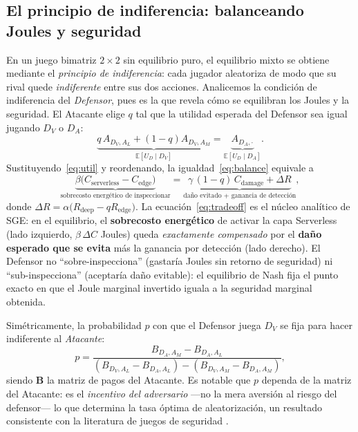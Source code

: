 \documentclass[10pt,twocolumn]{article}
\begin{document}
\subsection{El principio de indiferencia: balanceando Joules y seguridad}
\label{sec:indiff}
En un juego bimatriz $2\times2$ sin equilibrio puro, el equilibrio mixto se obtiene
mediante el \emph{principio de indiferencia}: cada jugador aleatoriza de modo que su
rival quede \emph{indiferente} entre sus dos acciones. Analicemos la condici\'on de
indiferencia del \emph{Defensor}, pues es la que revela c\'omo se equilibran los
Joules y la seguridad. El Atacante elige $q$ tal que la utilidad esperada del
Defensor sea igual jugando $D_V$ o $D_A$:
\begin{equation}
\label{eq:balance}
\underbrace{q\,A_{D_V,A_L} + (1-q)A_{D_V,A_M}}_{\mathbb{E}[U_D\mid D_V]}
=
\underbrace{A_{D_A,\cdot}}_{\mathbb{E}[U_D\mid D_A]}.
\end{equation}
Sustituyendo~\eqref{eq:util} y reordenando, la igualdad~\eqref{eq:balance} equivale a
\begin{equation}
\label{eq:tradeoff}
\underbrace{\beta\big(C_{\text{serverless}}-C_{\text{edge}}\big)}_{\text{sobrecosto energ\'etico de inspeccionar}}
=
\underbrace{\gamma\,(1-q)\,C_{\text{damage}} + \Delta R}_{\text{da\~no evitado + ganancia de detecci\'on}},
\end{equation}
donde $\Delta R = \alpha\big(R_{\text{deep}} - q R_{\text{edge}}\big)$. La
ecuaci\'on~\eqref{eq:tradeoff} es el n\'ucleo anal\'itico de SGE: en el equilibrio, el
\textbf{sobrecosto energ\'etico} de activar la capa Serverless (lado izquierdo,
$\beta\,\Delta C$ Joules) queda \emph{exactamente compensado} por el \textbf{da\~no
esperado que se evita} m\'as la ganancia por detecci\'on (lado derecho). El Defensor
no ``sobre-inspecciona'' (gastar\'ia Joules sin retorno de seguridad) ni
``sub-inspecciona'' (aceptar\'ia da\~no evitable): el equilibrio de Nash fija el punto
exacto en que el Joule marginal invertido iguala a la seguridad marginal obtenida.

Sim\'etricamente, la probabilidad $p$ con que el Defensor juega $D_V$ se fija para
hacer indiferente al \emph{Atacante}:
\begin{equation}
\label{eq:p}
p = \frac{B_{D_A,A_M}-B_{D_A,A_L}}{(B_{D_V,A_L}-B_{D_A,A_L})-(B_{D_V,A_M}-B_{D_A,A_M})},
\end{equation}
siendo $\mathbf{B}$ la matriz de pagos del Atacante. Es notable que $p$ dependa de la
matriz del Atacante: es el \emph{incentivo del adversario} ---no la mera aversi\'on al
riesgo del defensor--- lo que determina la tasa \'optima de aleatorizaci\'on, un
resultado consistente con la literatura de juegos de seguridad \cite{alpcan,manshaei}.
\end{document}
